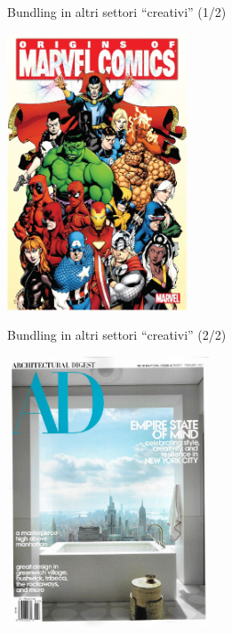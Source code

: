 \documentclass{beamer}
\begin{document}
\begin{frame}
{\centerline{Bundling in altri settori ``creativi'' (1/2)}}
\begin{center}
    \includegraphics[width=0.4\textwidth]{A2022.IDSEPC.ConcettoDiSoftware/BundlingMarvel.pdf}
\end{center}

\end{frame}

\begin{frame}
{\centerline{Bundling in altri settori ``creativi'' (2/2)}}
\begin{center}
    \includegraphics[width=0.45\textwidth]{A2022.IDSEPC.ConcettoDiSoftware/BundlingAD.pdf}
\end{center}

\end{frame}
\end{document}
